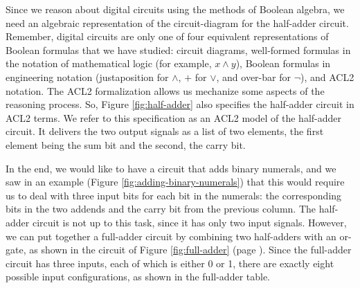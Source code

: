 Since we reason about digital circuits using the methods
of Boolean algebra, we need an algebraic representation
of the circuit-diagram for the half-adder circuit.
Remember, digital circuits are only one of four
equivalent representations of Boolean formulas that
we have studied: circuit diagrams, well-formed formulas
in the notation of mathematical logic (for example, $x \wedge y$),
Boolean formulas in engineering notation (justaposition for $\wedge$,
$+$ for $\vee$, and over-bar for $\neg$), and ACL2 notation.
The ACL2 formalization allows us mechanize some aspects of the reasoning process.
So, Figure \ref{fig:half-adder} also specifies the half-adder circuit in ACL2 terms.
We refer to this specification as an
ACL2 model of the half-adder circuit.
It delivers the two output signals as a list of two elements,
the first element being the sum bit and the second, the carry bit.

In the end, we would like to have a circuit
that adds binary numerals,
and we saw in an example (Figure \ref{fig:adding-binary-numerals})
that this would require us to deal with three input bits
for each bit in the numerals:
the corresponding bits in the two addends
and the carry bit from the previous column.
The half-adder circuit is not up to this task,
since it has only two input signals.
However, we can put together a full-adder circuit
by combining two half-adders with an or-gate,
as shown in the circuit of Figure \ref{fig:full-adder}
(page \pageref{fig:full-adder}).
Since the full-adder circuit has three inputs,
each of which is either 0 or 1,
there are exactly eight possible input configurations,
as shown in the full-adder table.

